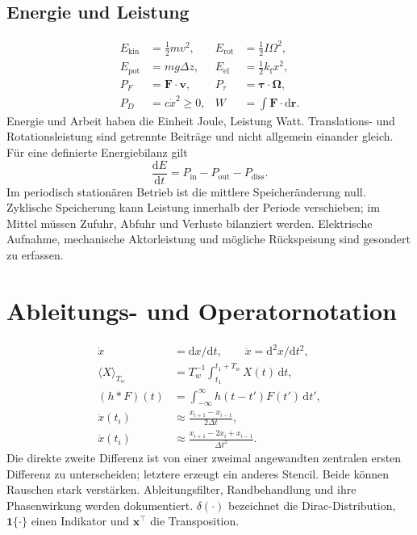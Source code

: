 \documentclass[11pt,a4paper]{article}
\newcommand{\dd}{\mathrm{d}}
\begin{document}
\subsection{Energie und Leistung}
\begin{align*}
E_{\mathrm{kin}}&=\tfrac12mv^2, & E_{\mathrm{rot}}&=\tfrac12I\Omega^2,\\
E_{\mathrm{pot}}&=mg\Delta z, & E_{\mathrm{el}}&=\tfrac12k_{\mathrm f}x^2,\\
P_F&=\mathbf F\cdot\mathbf v, & P_\tau&=\boldsymbol\tau\cdot\boldsymbol\Omega,\\
P_D&=c\dot x^2\ge0, & W&=\int\mathbf F\cdot\dd\mathbf r.
\end{align*}
Energie und Arbeit haben die Einheit Joule, Leistung Watt. Translations- und Rotationsleistung sind getrennte Beiträge und nicht allgemein einander gleich. Für eine definierte Energiebilanz gilt
\begin{equation}
\frac{\dd E}{\dd t}=P_{\mathrm{in}}-P_{\mathrm{out}}-P_{\mathrm{diss}}.
\end{equation}
Im periodisch stationären Betrieb ist die mittlere Speicheränderung null. Zyklische Speicherung kann Leistung innerhalb der Periode verschieben; im Mittel müssen Zufuhr, Abfuhr und Verluste bilanziert werden. Elektrische Aufnahme, mechanische Aktorleistung und mögliche Rückspeisung sind gesondert zu erfassen.

\section{Ableitungs- und Operatornotation}
\begin{align*}
\dot x&=\dd x/\dd t,\qquad \ddot x=\dd^2x/\dd t^2,\\
\langle X\rangle_{T_w}&=T_w^{-1}\int_{t_1}^{t_1+T_w}X(t)\,\dd t,\\
(h*F)(t)&=\int_{-\infty}^{\infty}h(t-t')F(t')\,\dd t',\\
\dot x(t_i)&\approx\frac{x_{i+1}-x_{i-1}}{2\Delta t},\\
\ddot x(t_i)&\approx\frac{x_{i+1}-2x_i+x_{i-1}}{\Delta t^2}.
\end{align*}
Die direkte zweite Differenz ist von einer zweimal angewandten zentralen ersten Differenz zu unterscheiden; letztere erzeugt ein anderes Stencil. Beide können Rauschen stark verstärken. Ableitungsfilter, Randbehandlung und ihre Phasenwirkung werden dokumentiert. $\delta(\cdot)$ bezeichnet die Dirac-Distribution, $\mathbf1\{\cdot\}$ einen Indikator und $\mathbf x^\top$ die Transposition.
\end{document}
